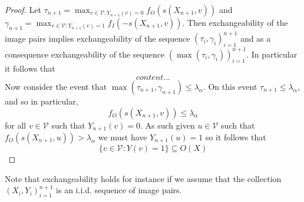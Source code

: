 \begin{proof}
	Let $\tau_{n+1}= \max_{v \in \mathcal{V}: Y_{n+1}(v) = 0} f_O(s(X_{n+1},v))$ and $\gamma_{n+1} = \max_{v \in \mathcal{V}: Y_{n+1}(v) = 1} f_I(-s(X_{n+1},v))$. Then exchangeability of the image pairs implies exchangeability of the sequence $(\tau_i, \gamma_i)_{i = 1}^{n+1}$ and as a consequence exchangeability of the sequence $(\max(\tau_i, \gamma_i))_{i = 1}^{n+1}$. 
	In particular it follows that 
	\begin{equation*}
		content...
	\end{equation*}
	Now consider the event that $\max(\tau_{n+1}, \gamma_{n+1}) \leq \lambda_{\alpha}$. On this event $\tau_{n+1} \leq \lambda_\alpha$, and so in particular, 
	\begin{equation*}
		f_O(s(X_{n+1},v)) \leq \lambda_\alpha 
	\end{equation*}
	for all $v \in \mathcal{V}$ such that $Y_{n+1}(v) = 0$. As such given $u \in \mathcal{V}$ such that $	f_O(s(X_{n+1},u)) > \lambda_\alpha$ we must have $Y_{n+1}(u) = 1$ so it follows that 
	\begin{equation*}
		\lbrace v\in \mathcal{V}: Y(v) = 1 \rbrace \subseteq O(X) 
	\end{equation*}
\end{proof}

\begin{remark}
	Note that exchangeability holds for instance if we assume that the collection $(X_i, Y_i)_{i = 1}^{n+1}$ is an i.i.d. sequence of image pairs.
\end{remark}

